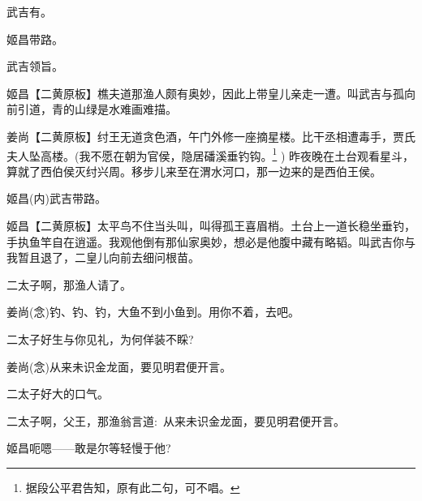 {武吉\hspace{30pt}有。

姬昌\hspace{30pt}带路。

武吉\hspace{30pt}领旨。

\setlength{\hangindent}{52pt}   %
{姬昌\hspace{30pt}【{\akai 二黄原板}】樵夫道那渔人颇有奥妙，因此上带皇儿亲走一遭。叫武吉与孤向前引道，青的山绿是水难画难描。}

\vspace{5pt}

\setlength{\hangindent}{52pt}   %
{姜尚\hspace{30pt}【{\akai 二黄原板}】纣王无道贪色酒，午门外修一座摘星楼。比干丞相遭毒手，贾氏夫人坠高楼。(我不愿在朝为官侯，隐居磻溪垂钓钩。\footnote{据段公平{\scriptsize 君}告知，原有此二句，可不唱。}%
) 昨夜晚在土台观看星斗，算就了西伯侯灭纣兴周。移步儿来至在渭水河口，那一边来的是西伯王侯。}

姬昌\hspace{30pt}({\akai 内})武吉带路。

\setlength{\hangindent}{52pt}   %
{姬昌\hspace{30pt}【{\akai 二黄原板}】太平鸟不住当头叫，叫得孤王喜眉梢。土台上一道长稳坐垂钓，手执鱼竿自在逍遥。我观他倒有那仙家奥妙，想必是他腹中藏有略韬。叫武吉你与我暂且退了，二皇儿向前去细问根苗。}

{\akai 二}太子\hspace{20pt}啊，那渔人请了。

姜尚\hspace{30pt}({\akai 念})钓、钓、钓，大鱼不到小鱼到。用你不着，去吧。

{\akai 二}太子\hspace{20pt}好生与你见礼，为何佯装不睬?

姜尚\hspace{30pt}({\akai 念})从来未识金龙面，要见明君便开言。

{\akai 二}太子\hspace{20pt}好大的口气。

{\akai 二}太子\hspace{20pt}啊，父王，那渔翁言道:~从来未识金龙面，要见明君便开言。

姬昌\hspace{30pt}呃嗯------敢是尔等轻慢于他?

}
